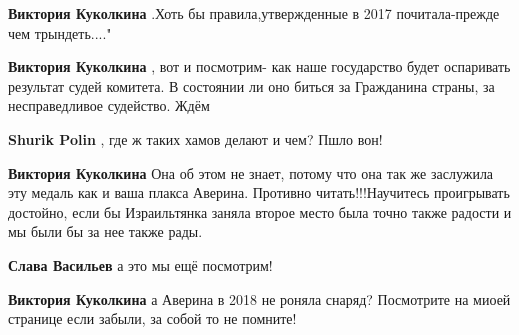 \begin{itemize}
\begin{itemize}
\textbf{Виктория Куколкина} .Хоть бы правила,утвержденные в 2017 почитала-прежде чем трындеть...."

 
\textbf{Виктория Куколкина} , вот и посмотрим- как наше государство будет оспаривать результат судей комитета. В состоянии ли оно биться за Гражданина страны, за несправедливое судейство. Ждём

 
\textbf{Shurik Polin} , где ж таких хамов делают и чем? Пшло вон!

 
\textbf{Виктория Куколкина} Она об этом не знает, потому что она так же заслужила эту медаль как и ваша плакса Аверина. Противно читать!!!Научитесь проигрывать достойно, если бы Израильтянка заняла второе место была точно также радости и мы были бы за нее также рады.

 
\textbf{Слава Васильев} а это мы ещё посмотрим!

 
\textbf{Виктория Куколкина} а Аверина в 2018 не роняла снаряд? Посмотрите на миоей странице если забыли, за собой то не помните!

 

\end{itemize}
\end{itemize}
